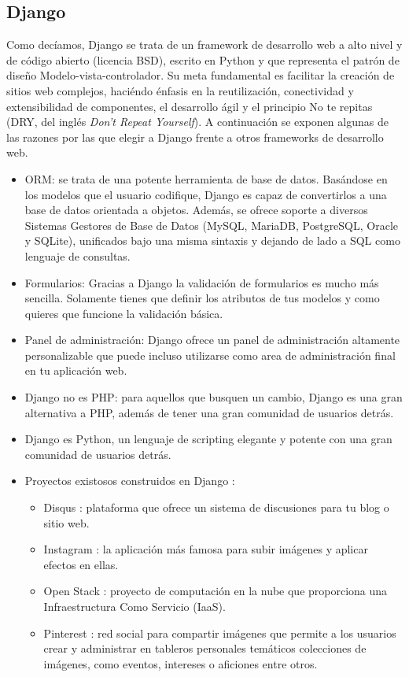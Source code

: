 \subsection{Django} \cite{Dj}
Como decíamos, Django se trata de un framework de desarrollo web a alto nivel y de código abierto (licencia BSD), escrito en Python y que representa el patrón de diseño Modelo-vista-controlador. Su meta fundamental es facilitar la creación de sitios web complejos, haciéndo énfasis en la reutilización, conectividad y extensibilidad de componentes, el desarrollo ágil y el principio No te repitas (DRY, del inglés \textit{Don't Repeat Yourself}). A continuación se exponen algunas de las razones por las que elegir a Django frente a otros frameworks de desarrollo web.

\begin{itemize}
    \item ORM: se trata de una potente herramienta de base de datos. Basándose en los modelos que el usuario codifique, Django es capaz de convertirlos a una base de datos orientada a objetos. Además, se ofrece soporte a diversos Sistemas Gestores de Base de Datos (MySQL, MariaDB, PostgreSQL, Oracle y SQLite), unificados bajo una misma sintaxis y dejando de lado a SQL como lenguaje de consultas.
    \item Formularios: Gracias a Django la validación de formularios es mucho más sencilla. Solamente tienes que definir los atributos de tus modelos y como quieres que funcione la validación básica.
    \item Panel de administración: Django ofrece un panel de administración altamente personalizable que puede incluso utilizarse como area de administración final en tu aplicación web.
    \item Django no es PHP: para aquellos que busquen un cambio, Django es una gran alternativa a PHP, además de tener una gran comunidad de usuarios detrás.
    \item Django es Python, un lenguaje de scripting elegante y potente con una gran comunidad de usuarios detrás.
    \item Proyectos existosos construidos en Django \cite{SUDj}: 
    \begin{itemize}
        \item Disqus \cite{Disqus}: plataforma que ofrece un sistema de discusiones para tu blog o sitio web.
        \item Instagram \cite{Instagram}: la aplicación más famosa para subir imágenes y aplicar efectos en ellas.
        \item Open Stack \cite{Open Stack}: proyecto de computación en la nube que proporciona una Infraestructura Como Servicio (IaaS).
        \item Pinterest \cite{Pinterest}: red social para compartir imágenes que permite a los usuarios crear y administrar en tableros personales temáticos colecciones de imágenes, como eventos, intereses o aficiones entre otros.
    \end{itemize}
\end{itemize}

